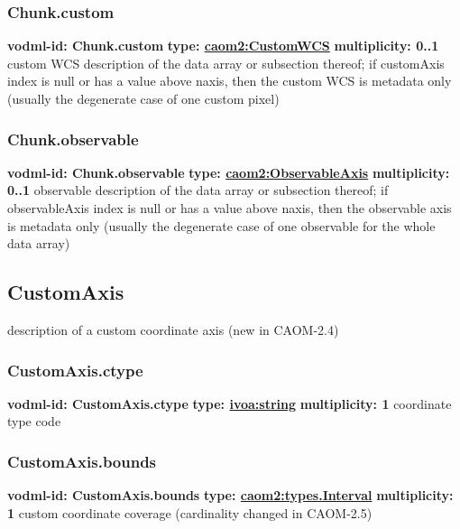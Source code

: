     \subsubsection{Chunk.custom}
      \textbf{vodml-id: Chunk.custom} \newline
      \textbf{type: \hyperref[sect:CustomWCS]{caom2:CustomWCS}} \newline
      \textbf{multiplicity: 0..1} \newline
      custom WCS description of the data array or subsection thereof; if customAxis index is null or has a value above {naxis}, then the custom WCS is metadata only (usually the degenerate case of one custom pixel)

    \subsubsection{Chunk.observable}
      \textbf{vodml-id: Chunk.observable} \newline
      \textbf{type: \hyperref[sect:ObservableAxis]{caom2:ObservableAxis}} \newline
      \textbf{multiplicity: 0..1} \newline
      observable description of the data array or subsection thereof; if observableAxis index is null or has a value above {naxis}, then the observable axis is metadata only (usually the degenerate case of one observable for the whole data array)

  \subsection{CustomAxis}
  \label{sect:CustomAxis}
    description of a custom coordinate axis (new in CAOM-2.4)

    \subsubsection{CustomAxis.ctype}
      \textbf{vodml-id: CustomAxis.ctype} \newline
      \textbf{type: \hyperref[sect:ivoa]{ivoa:string}} \newline
      \textbf{multiplicity: 1} \newline
      coordinate type code

    \subsubsection{CustomAxis.bounds}
      \textbf{vodml-id: CustomAxis.bounds} \newline
      \textbf{type: \hyperref[sect:types.Interval]{caom2:types.Interval}} \newline
      \textbf{multiplicity: 1} \newline
      custom coordinate coverage (cardinality changed in CAOM-2.5)

